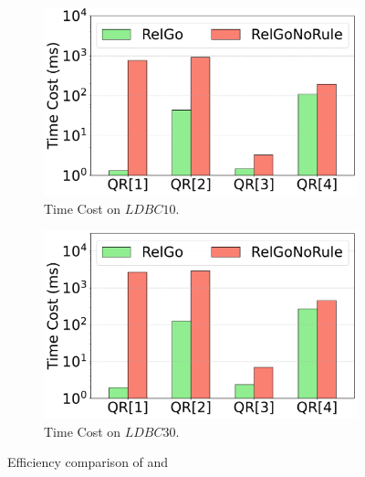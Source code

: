 \begin{figure}[ht]
    \vspace{-1em}
    \centering
    \begin{subfigure}[b]{.45\linewidth}
        \centering
        \includegraphics[width=\linewidth]{./figures/exp/filter_sf10.pdf}
        \vspace{-1.5em}
        \caption{Time Cost on $LDBC10$.}
        \label{fig:exp-filter-sf10}
    \end{subfigure}
    \begin{subfigure}[b]{0.45\linewidth}
        \centering
        \includegraphics[width=\linewidth]{./figures/exp/filter_sf30.pdf}
        \vspace{-1.5em}
        \caption{Time Cost on $LDBC30$.}
        \label{fig:exp-filter-sf30}
    \end{subfigure}
    \caption{Efficiency comparison of \name and \relgonofi}
    \label{fig:exp-filter}
\end{figure}

